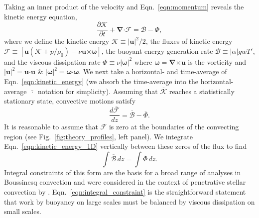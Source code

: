 \documentclass[twocolumn]{aastex631}
\renewcommand{\vec}[1]{\boldsymbol{#1}}
\renewcommand{\dot}{\vec{\cdot}}
\renewcommand{\bar}[1]{\overline{#1}}
\newcommand{\grad}{\vec{\nabla}}
\newcommand{\cross}{\vec{\times}}
\begin{document}
Taking an inner product of the velocity and Eqn.~\ref{eqn:momentum} reveals the kinetic energy equation,
\begin{equation}
\frac{\partial \mathcal{K}}{\partial t}
+ \grad\dot\mathcal{F}
= \mathcal{B} - \Phi,
\label{eqn:kinetic_energy}
\end{equation}
where we define the kinetic energy $\mathcal{K} \equiv |\vec{u}|^2/2$, the fluxes of kinetic energy $\mathcal{F} \equiv \left[\vec{u}(\mathcal{K} + p/\rho_0) - \nu\vec{u}\cross\vec{\omega} \right]$, the buoyant energy generation rate $\mathcal{B} \equiv |\alpha| g w T'$, and the viscous dissipation rate $\Phi \equiv \nu |\vec{\omega}|^2$ where $\vec{\omega} = \grad\cross\vec{u}$ is the vorticity and $|\vec{u}|^2 = \vec{u}\dot\vec{u}$ \& $|\vec{\omega}|^2 = \vec{\omega}\dot\vec{\omega}$.
We next take a horizontal- and time-average of Eqn.~\ref{eqn:kinetic_energy} (we absorb the time-average into the horizontal-average $\bar{\,\cdot\,}$ notation for simplicity).
Assuming that $\bar{\mathcal{K}}$ reaches a statistically stationary state, convective motions satisfy
\begin{equation}
\frac{d\bar{\mathcal{F}}}{dz} = \bar{\mathcal{B}} - \bar{\Phi}.
\label{eqn:kinetic_energy_1D}
\end{equation}
It is reasonable to assume that $\mathcal{F}$ is zero at the boundaries of the convecting region (see Fig.~\ref{fig:theory_profiles}, left panel).
We integrate Eqn.~\ref{eqn:kinetic_energy_1D} vertically between these zeros of the flux to find
\begin{equation}
\int \bar{\mathcal{B}}\,dz = \int \bar{\Phi}\,dz.
\label{eqn:integral_constraint}
\end{equation}
Integral constraints of this form are the basis for a broad range of analyses in Boussinesq convection \citep[see e.g.,][]{ahlers_etal_2009, goluskin2016} and were considered in the context of penetrative stellar convection by \citet{roxburgh1989}.
Eqn.~\ref{eqn:integral_constraint} is the straightforward statement that work by buoyancy on large scales must be balanced by viscous dissipation on small scales.
\end{document}
